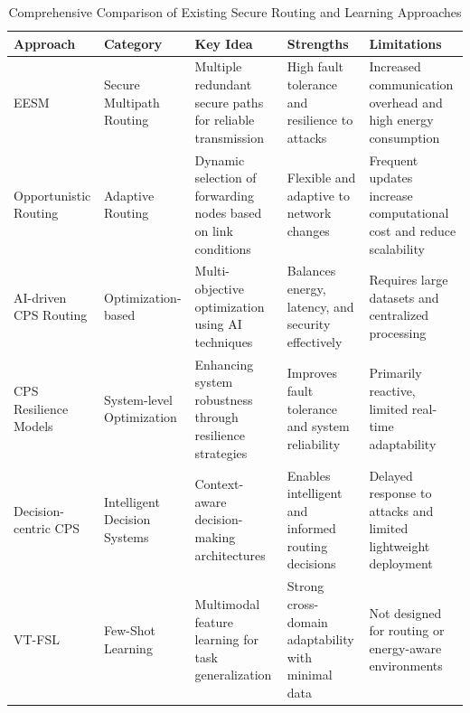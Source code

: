 \documentclass[pdflatex,sn-mathphys-num]{sn-jnl}
\begin{document}
\begin{table}[h]
\centering
\tiny
\caption{Comprehensive Comparison of Existing Secure Routing and Learning Approaches}
\label{tab:comparison}
\renewcommand{\arraystretch}{1.3}
\begin{tabular}{|p{1.5cm}|p{1.5cm}|p{2.8cm}|p{2cm}|p{2.8cm}|}
\hline
\textbf{Approach} & \textbf{Category} & \textbf{Key Idea} & \textbf{Strengths} & \textbf{Limitations} \\
\hline

EESM \cite{biswas2023eesm} 
& Secure Multipath Routing 
& Multiple redundant secure paths for reliable transmission 
& High fault tolerance and resilience to attacks 
& Increased communication overhead and high energy consumption \\

\hline

Opportunistic Routing \cite{narayana2026secure} 
& Adaptive Routing 
& Dynamic selection of forwarding nodes based on link conditions 
& Flexible and adaptive to network changes 
& Frequent updates increase computational cost and reduce scalability \\

\hline

AI-driven CPS Routing \cite{wong2025sustainable} 
& Optimization-based 
& Multi-objective optimization using AI techniques 
& Balances energy, latency, and security effectively 
& Requires large datasets and centralized processing \\

\hline

CPS Resilience Models \cite{mehdiyev2025resilience} 
& System-level Optimization 
& Enhancing system robustness through resilience strategies 
& Improves fault tolerance and system reliability 
& Primarily reactive, limited real-time adaptability \\

\hline

Decision-centric CPS \cite{jithish2021decision} 
& Intelligent Decision Systems 
& Context-aware decision-making architectures 
& Enables intelligent and informed routing decisions 
& Delayed response to attacks and limited lightweight deployment \\

\hline

VT-FSL \cite{li2026vtfsl} 
& Few-Shot Learning 
& Multimodal feature learning for task generalization 
& Strong cross-domain adaptability with minimal data 
& Not designed for routing or energy-aware environments \\


\end{tabular}
\end{table}
\end{document}
